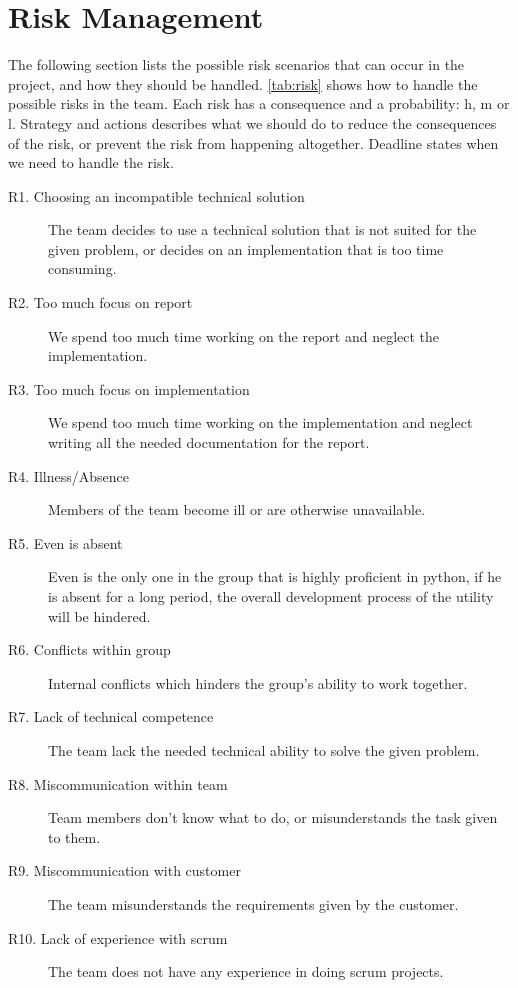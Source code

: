\section{Risk Management}
\label{sec:plan:risk}
The following section lists the possible risk scenarios that can occur in the project, and how they should be handled. \autoref{tab:risk} shows how to handle the possible risks in the team. Each risk has a consequence and a probability:  \Gls{h}, \Gls{m} or \Gls{l}.
Strategy and actions describes what we should do to reduce the consequences of the risk, or prevent the risk from happening altogether. Deadline states when we need to handle the risk.
\begin{description}
\item[R1. Choosing an incompatible technical solution]  The team decides to use a technical solution that is not suited for the given problem, or decides on an implementation that is too time consuming.
\item[R2. Too much focus on report]   We spend too much time working on the report and neglect the implementation. 
\item[R3. Too much focus on implementation]  We spend too much time working on the implementation and neglect writing all the needed documentation for the report.
\item[R4. Illness/Absence]  Members of the team become ill or are otherwise unavailable. 
\item[R5. Even is absent]  Even is the only one in the group that is highly proficient in \Gls{python}, if he is absent for a long period, the overall development process of the utility will be hindered.
\item[R6. Conflicts within group]   Internal conflicts which hinders the group's ability to work together. 
\item[R7. Lack of technical competence]  The team lack the needed technical ability to solve the given problem. 
\item[R8. Miscommunication within team]  Team members don’t know what to do, or misunderstands the task given to them. 
\item[R9. Miscommunication with customer]  The team misunderstands the requirements given by the customer. 
\item[R10. Lack of experience with \Gls{scrum}]  The team does not have any experience in doing \Gls{scrum} projects.
\end{description}

